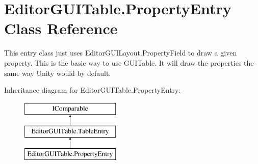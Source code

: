 \hypertarget{class_editor_g_u_i_table_1_1_property_entry}{}\section{Editor\+G\+U\+I\+Table.\+Property\+Entry Class Reference}
\label{class_editor_g_u_i_table_1_1_property_entry}


This entry class just uses Editor\+G\+U\+I\+Layout.\+Property\+Field to draw a given property. This is the basic way to use G\+U\+I\+Table. It will draw the properties the same way Unity would by default.  


Inheritance diagram for Editor\+G\+U\+I\+Table.\+Property\+Entry\+:\begin{figure}[H]
\begin{center}
\leavevmode
\includegraphics[height=3.000000cm]{class_editor_g_u_i_table_1_1_property_entry}
\end{center}
\end{figure}
